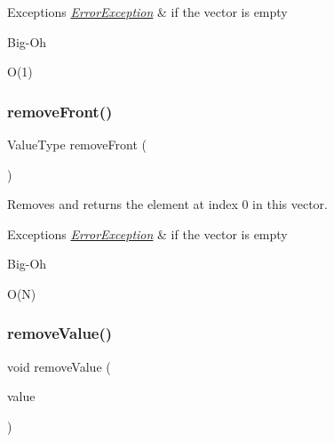 \begin{DoxyExceptions}{Exceptions}
{\em \mbox{\hyperlink{classErrorException}{Error\+Exception}}} & if the vector is empty \\
\hline
\end{DoxyExceptions}
\begin{DoxyRefDesc}{Big-\/\+Oh}
\item[\mbox{\hyperlink{BigOh__BigOh000129}{Big-\/\+Oh}}]O(1) \end{DoxyRefDesc}
\mbox{\label{classVector_a02453aa96e93c38ca4c1d176307c8a63}} 
\subsubsection{\texorpdfstring{remove\+Front()}{removeFront()}}
{\footnotesize\ttfamily Value\+Type remove\+Front (\begin{DoxyParamCaption}{ }\end{DoxyParamCaption})}



Removes and returns the element at index 0 in this vector. 


\begin{DoxyExceptions}{Exceptions}
{\em \mbox{\hyperlink{classErrorException}{Error\+Exception}}} & if the vector is empty \\
\hline
\end{DoxyExceptions}
\begin{DoxyRefDesc}{Big-\/\+Oh}
\item[\mbox{\hyperlink{BigOh__BigOh000128}{Big-\/\+Oh}}]O(\+N) \end{DoxyRefDesc}
\mbox{\label{classVector_a10e8154a489093d2b1f20596342bcd78}} 
\subsubsection{\texorpdfstring{remove\+Value()}{removeValue()}}
{\footnotesize\ttfamily void remove\+Value (\begin{DoxyParamCaption}\item[{const Value\+Type \&}]{value }\end{DoxyParamCaption})}



